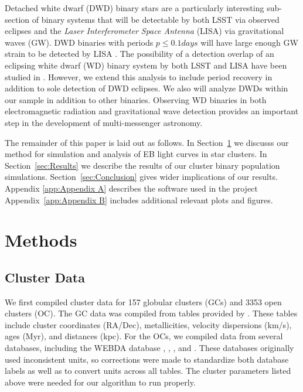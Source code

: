 \documentclass[twocolumn]{aastex63}
\begin{document}
Detached white dwarf (DWD) binary stars are a particularly interesting sub-section of binary systems that will be detectable by both LSST via observed eclipses and the \textit{Laser Interferometer Space Antenna} (LISA) via gravitational waves (GW). DWD binaries with periods $p \leq 0.1 days$ will have large enough GW strain to be detected by LISA \citep{2017MNRAS.470.1894K}. The possibility of a detection overlap of an eclipsing white dwarf (WD) binary system by both LSST and LISA have been studied in \citet{2017MNRAS.470.1894K}. However, we extend this analysis to include period recovery in addition to sole detection of DWD eclipses. We also will analyze DWDs within our sample in addition to other binaries. Observing WD binaries in both electromagnetic radiation and gravitational wave detection provides an important step in the development of multi-messenger astronomy.

The remainder of this paper is laid out as follows. In Section~\ref{sec:Methods} we discusss our method for simulation and analysis of EB light curves in star clusters. In Section~\ref{sec:Results} we describe the results of our cluster binary population simulations. Section~\ref{sec:Conclusion} gives wider implications of our results. Appendix \ref{app:Appendix A} describes the software used in the project
Appendix~\ref{app:Appendix B} includes additional relevant plots and figures.


\section{Methods} \label{sec:Methods}

\subsection{Cluster Data} \label{sec:compiling}

We first compiled cluster data for 157 globular clusters (GCs) and 3353 open clusters (OC). The GC data was compiled from tables provided by \citet{1996AJ....112.1487H}. These tables include cluster coordinates (RA/Dec), metallicities, velocity dispersions (km/s), ages (Myr), and distances (kpc). For the OCs, we compiled data from several databases, including the WEBDA database \citet{1995MNRAS.275..828M}, \citet{2013A&A...558A..53K}, \citet{2004A&A...414..163S}, and \citet{2008A&A...477..165P}. These databases originally used inconsistent units, so corrections were made to standardize both database labels as well as to convert units across all tables. The cluster parameters listed above were needed for our algorithm to run properly.
\end{document}
